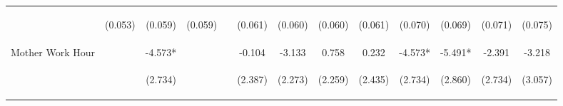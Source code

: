 \begin{tabular}{lcccccccccccc}
 & \begin{footnotesize}(0.053)\end{footnotesize} & \begin{footnotesize}(0.059)\end{footnotesize} & \begin{footnotesize}(0.059)\end{footnotesize} & \begin{footnotesize}\end{footnotesize} & \begin{footnotesize}(0.061)\end{footnotesize} & \begin{footnotesize}(0.060)\end{footnotesize} & \begin{footnotesize}(0.060)\end{footnotesize} & \begin{footnotesize}(0.061)\end{footnotesize} & \begin{footnotesize}(0.070)\end{footnotesize} & \begin{footnotesize}(0.069)\end{footnotesize} & \begin{footnotesize}(0.071)\end{footnotesize} & \begin{footnotesize}(0.075)\end{footnotesize}\\
\noalign{\smallskip}Mother Work Hour &  & -4.573* &  &  & -0.104 & -3.133 & 0.758 & 0.232 & -4.573* & -5.491* & -2.391 & -3.218\\
 & \begin{footnotesize}\end{footnotesize} & \begin{footnotesize}(2.734)\end{footnotesize} & \begin{footnotesize}\end{footnotesize} & \begin{footnotesize}\end{footnotesize} & \begin{footnotesize}(2.387)\end{footnotesize} & \begin{footnotesize}(2.273)\end{footnotesize} & \begin{footnotesize}(2.259)\end{footnotesize} & \begin{footnotesize}(2.435)\end{footnotesize} & \begin{footnotesize}(2.734)\end{footnotesize} & \begin{footnotesize}(2.860)\end{footnotesize} & \begin{footnotesize}(2.734)\end{footnotesize} & \begin{footnotesize}(3.057)\end{footnotesize}\\

\end{tabular}
